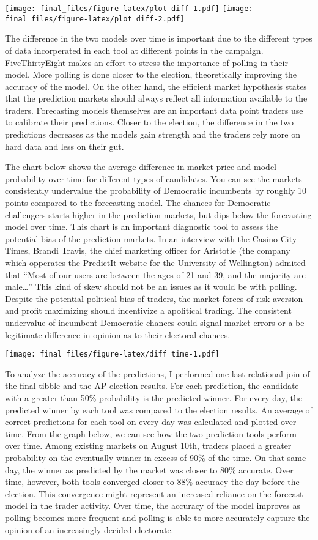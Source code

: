 \documentclass[]{article}
\begin{document}
\texttt{[image: final\_files/figure-latex/plot diff-1.pdf]}
\texttt{[image: final\_files/figure-latex/plot diff-2.pdf]}

The difference in the two models over time is important due to the
different types of data incorperated in each tool at different points in
the campaign. FiveThirtyEight makes an effort to stress the importance
of polling in their model. More polling is done closer to the election,
theoretically improving the accuracy of the model. On the other hand,
the efficient market hypothesis states that the prediction markets
should always reflect all information available to the traders.
Forecasting models themselves are an important data point traders use to
calibrate their predictions. Closer to the election, the difference in
the two predictions decreases as the models gain strength and the
traders rely more on hard data and less on their gut.

The chart below shows the average difference in market price and model
probability over time for different types of candidates. You can see the
markets consistently undervalue the probability of Democratic incumbents
by roughly 10 points compared to the forecasting model. The chances for
Democratic challengers starts higher in the prediction markets, but dips
below the forecasting model over time. This chart is an important
diagnostic tool to assess the potential bias of the prediction markets.
In an interview with the Casino City Times, Brandi Travis, the chief
marketing officer for Aristotle (the company which opperates the
PredictIt website for the University of Wellington) admited that ``Most
of our users are between the ages of 21 and 39, and the majority are
male\ldots{}'' This kind of skew should not be an issues as it would be
with polling. Despite the potential political bias of traders, the
market forces of risk aversion and profit maximizing should incentivize
a apolitical trading. The consistent undervalue of incumbent Democratic
chances could signal market errors or a be legitimate difference in
opinion as to their electoral chances.

\texttt{[image: final\_files/figure-latex/diff time-1.pdf]}

To analyze the accuracy of the predictions, I performed one last
relational join of the final tibble and the AP election results. For
each prediction, the candidate with a greater than 50\% probability is
the predicted winner. For every day, the predicted winner by each tool
was compared to the election results. An average of correct predictions
for each tool on every day was calculated and plotted over time. From
the graph below, we can see how the two prediction tools perform over
time. Among existing markets on August 10th, traders placed a greater
probability on the eventually winner in excess of 90\% of the time. On
that same day, the winner as predicted by the market was closer to 80\%
accurate. Over time, however, both tools converged closer to 88\%
accuracy the day before the election. This convergence might represent
an increased reliance on the forecast model in the trader activity. Over
time, the accuracy of the model improves as polling becomes more
frequent and polling is able to more accurately capture the opinion of
an increasingly decided electorate.
\end{document}
